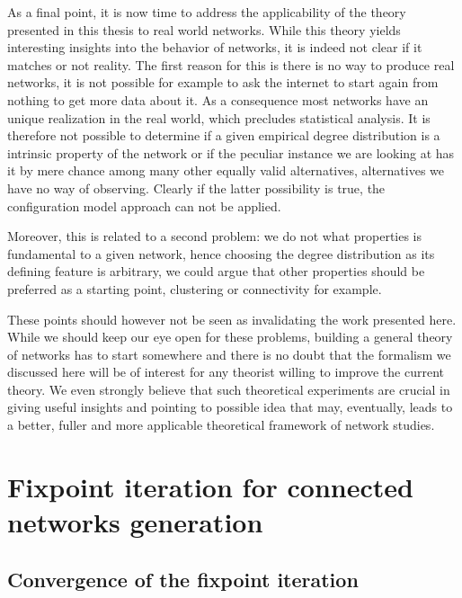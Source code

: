 \documentclass[
11pt, %
american, %
singlespacing, %
final, %
nolistspacing, %
liststotoc, %
headsepline, %
]{MastersDoctoralThesis} %
\begin{document}
As a final point, it is now time to address the applicability of the theory presented in this thesis to real world networks. While this theory yields interesting insights into the behavior of networks, it is indeed not clear if it matches or not reality. The first reason for this is there is no way to produce real networks, it is not possible for example to ask the internet to start again from nothing to get more data about it. As a consequence most networks have an unique realization in the real world, which precludes statistical analysis. It is therefore not possible to determine if a given empirical degree distribution is a intrinsic property of the network or if the peculiar instance we are looking at has it by mere chance among many other equally valid alternatives, alternatives we have no way of observing. Clearly if the latter possibility is true, the configuration model approach can not be applied.

Moreover, this is related to a second problem: we do not what properties is fundamental to a given network, hence choosing the degree distribution as its defining feature is arbitrary, we could argue that other properties should be preferred as a starting point, clustering or connectivity for example.

These points should however not be seen as invalidating the work presented here. While we should keep our eye open for these problems, building a general theory of networks has to start somewhere and there is no doubt that the formalism we discussed here will be of interest for any theorist willing to improve the current theory. We even strongly believe that such theoretical experiments are crucial in giving useful insights and pointing to possible idea that may, eventually, leads to a better, fuller and more applicable theoretical framework of network studies.


\appendix  %


\chapter{Fixpoint iteration for connected networks generation}
\section{Convergence of the fixpoint iteration}
\label{Appendix: Fixpoint convergence}
\end{document}
